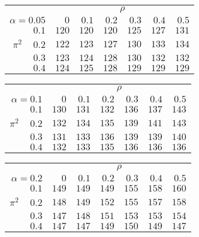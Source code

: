 \begin{tabular}{r|rrrrrr}
\hline\hline
 &\multicolumn{6}{c}{$\rho$} \\ 
 $\alpha = 0.05$ & $0$ & $0.1$ & $0.2$ & $0.3$ & $0.4$ & $0.5$ \\ 
 \hline$0.1$ & $120$ & $120$ & $120$ & $125$ & $127$ & $131$\\ 
$\pi^2\;\;\;$ $0.2$ & $122$ & $123$ & $127$ & $130$ & $133$ & $134$\\ 
$0.3$ & $123$ & $124$ & $128$ & $130$ & $132$ & $132$\\ 
$0.4$ & $124$ & $125$ & $128$ & $129$ & $129$ & $129$\\ 
 \hline 
 \end{tabular}
 
 \vspace{2em} 
 
\begin{tabular}{r|rrrrrr}
\hline\hline
 &\multicolumn{6}{c}{$\rho$} \\ 
 $\alpha = 0.1$ & $0$ & $0.1$ & $0.2$ & $0.3$ & $0.4$ & $0.5$ \\ 
 \hline$0.1$ & $130$ & $131$ & $132$ & $136$ & $137$ & $143$\\ 
$\pi^2\;\;\;$ $0.2$ & $132$ & $134$ & $135$ & $139$ & $141$ & $143$\\ 
$0.3$ & $131$ & $133$ & $136$ & $139$ & $139$ & $140$\\ 
$0.4$ & $132$ & $133$ & $135$ & $136$ & $136$ & $136$\\ 
 \hline 
 \end{tabular}
 
 \vspace{2em} 
 
\begin{tabular}{r|rrrrrr}
\hline\hline
 &\multicolumn{6}{c}{$\rho$} \\ 
 $\alpha = 0.2$ & $0$ & $0.1$ & $0.2$ & $0.3$ & $0.4$ & $0.5$ \\ 
 \hline$0.1$ & $149$ & $149$ & $149$ & $155$ & $158$ & $160$\\ 
$\pi^2\;\;\;$ $0.2$ & $148$ & $149$ & $152$ & $155$ & $157$ & $158$\\ 
$0.3$ & $147$ & $148$ & $151$ & $153$ & $153$ & $154$\\ 
$0.4$ & $147$ & $147$ & $149$ & $150$ & $149$ & $147$\\ 
 \hline 
 \end{tabular}
